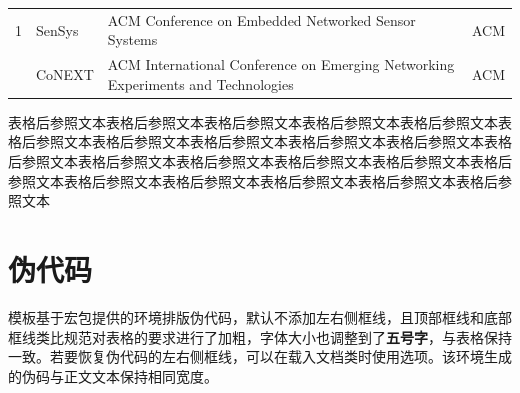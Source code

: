 \documentclass[doctor, vlined, ]{DissertUESTC}
\begin{document}
\begin{longtable}{m{2em}<{\centering} p{4.5em} p{15em} p{6em}}
		1 & SenSys & ACM Conference on Embedded Networked Sensor Systems & ACM \\
		\pagebreak  %
		2 & CoNEXT & ACM International Conference on Emerging Networking Experiments and Technologies & ACM \\
		
		
		
	\end{longtable}

	表格后参照文本表格后参照文本表格后参照文本表格后参照文本表格后参照文本表格后参照文本表格后参照文本表格后参照文本表格后参照文本表格后参照文本表格后参照文本表格后参照文本表格后参照文本表格后参照文本表格后参照文本表格后参照文本表格后参照文本表格后参照文本表格后参照文本表格后参照文本表格后参照文本
	
	\clearpage
	\section{伪代码}
	
	模板基于\href{https://mirrors.sustech.edu.cn/CTAN/macros/latex/contrib/algorithm2e/doc/algorithm2e.pdf}{\ttfamily\color{DarkRed}}宏包提供的环境排版伪代码，默认不添加左右侧框线，且顶部框线和底部框线类比规范对表格的要求进行了加粗，字体大小也调整到了\textbf{五号字}，与表格保持一致。若要恢复伪代码的左右侧框线，可以在载入文档类时使用选项。该环境生成的伪码与正文文本保持相同宽度。
	
\end{document}

